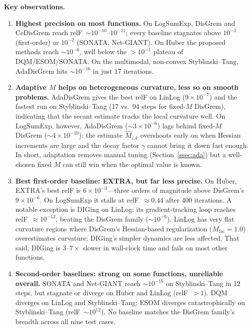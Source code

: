 \documentclass[11pt,a4paper]{article}
\begin{document}
	\noindent\textbf{Key observations.}
	\begin{enumerate}[leftmargin=1.4em,itemsep=2pt]
		\item \textbf{Highest precision on most functions.}
		On LogSumExp, DisGrem and CeDisGrem reach
		relF~$\sim10^{-10}$--$10^{-11}$; every baseline stagnates above
		$10^{-3}$ (first-order) or $10^{-2}$ (SONATA, Net-GIANT).
		On Huber the proposed methods reach $\sim10^{-6}$, well
		below the $>10^{-1}$ plateau of DQM/ESOM/SONATA.
		On the multimodal, non-convex Styblinski--Tang, AdaDisGrem
		hits $\sim10^{-16}$ in just 17 iterations.
		
		\item \textbf{Adaptive $M$ helps on heterogeneous curvature,
			less so on smooth problems.}
		AdaDisGrem gives the best relF on LinLog ($9{\times}10^{-7}$)
		and the fastest run on Styblinski--Tang (17 vs.\ 94 steps for
		fixed-$M$ DisGrem), indicating that the secant estimate
		tracks the local curvature well.
		On LogSumExp, however, AdaDisGrem ($\sim3{\times}10^{-6}$)
		lags behind fixed-$M$ DisGrem ($\sim4{\times}10^{-10}$):
		the estimate $\hat M_{i,k}$ overshoots early on when Hessian
		increments are large and the decay factor $\gamma$ cannot
		bring it down fast enough.
		In short, adaptation removes manual tuning
		(Section~\ref{ssec:ada}) but a well-chosen fixed $M$ can
		still win when the optimal value is known.
		
		\item \textbf{Best first-order baseline: EXTRA, but far less
			precise.}
		On Huber, EXTRA's best relF is $6{\times}10^{-3}$---three
		orders of magnitude above DisGrem's $9{\times}10^{-6}$.
		On LogSumExp it stalls at relF~$\approx0.44$ after 400 iterations.
		A notable exception is DIGing on LinLog: its gradient-tracking
		loop reaches relF~$\approx10^{-12}$, beating the DisGrem
		family ($\sim10^{-6}$).
		LinLog has very flat curvature regions where DisGrem's
		Hessian-based regularization ($M_{\mathrm{fac}}{=}1.0$)
		overestimates curvature; DIGing's simpler dynamics are less
		affected.
		That said, DIGing is $3$--$7\times$ slower in wall-clock time
		and fails on most other functions.
		
		\item \textbf{Second-order baselines: strong on some functions,
			unreliable overall.}
		SONATA and Net-GIANT reach $\sim10^{-16}$ on Styblinski--Tang
		in 12 steps, but stagnate or diverge on Huber and LinLog
		(relF~$>1$).
		DQM diverges on LinLog and Styblinski--Tang; ESOM diverges
		catastrophically on Styblinski--Tang (relF~$\sim10^{12}$).
		No baseline matches the DisGrem family's breadth across all
		nine test cases.
		

\end{enumerate}
\end{document}
